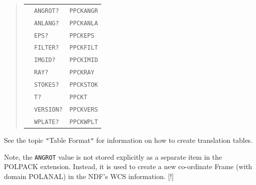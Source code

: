 \documentclass[twoside,11pt]{starlink}
\begin{document}
{{{\begin{quote}
\begin{tabular}{lll}
              &  \texttt{ANGROT? }    & \texttt{PPCKANGR}  \\
              &  \texttt{ANLANG? }    & \texttt{PPCKANLA} \\
              &  \texttt{EPS?    }    & \texttt{PPCKEPS} \\
              &  \texttt{FILTER? }    & \texttt{PPCKFILT} \\
              &  \texttt{IMGID?  }    & \texttt{PPCKIMID} \\
              &  \texttt{RAY?    }    & \texttt{PPCKRAY} \\
              &  \texttt{STOKES? }    & \texttt{PPCKSTOK} \\
              &  \texttt{T?      }    & \texttt{PPCKT} \\
              &  \texttt{VERSION?}    & \texttt{PPCKVERS} \\
              &  \texttt{WPLATE? }    & \texttt{PPCKWPLT}
\end{tabular}
\end{quote}

         See the topic \texttt{"}Table Format\texttt{"} for information on how
         to create translation tables.

         Note, the \texttt{ANGROT} value is not stored explicitly as a
         separate item in the POLPACK extension. Instead, it is used to
         create a new co-ordinate Frame (with domain POLANAL) in the NDF's
         WCS information. [!]
      }
   }
   }
\end{document}
